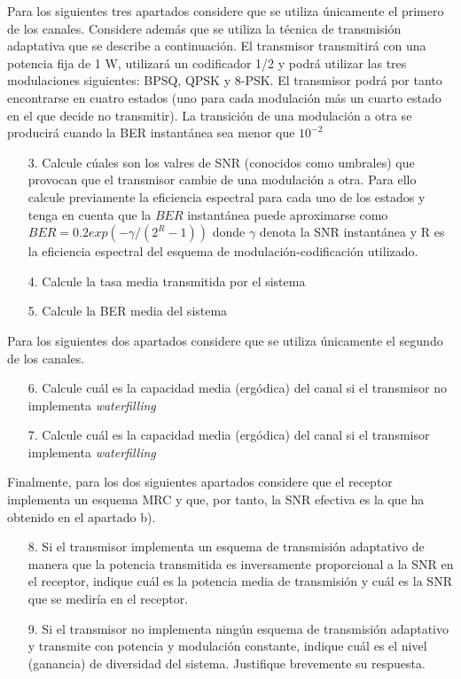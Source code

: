 \documentclass[fleqn,14pt]{article}
\begin{document}
Para los siguientes tres apartados considere que se utiliza únicamente el primero de los canales. Considere además que se utiliza la técnica de transmisión adaptativa que se describe a continuación. El transmisor transmitirá con una potencia fija de 1 W, utilizará un codificador 1/2 y podrá utilizar las tres modulaciones siguientes: BPSQ, QPSK y 8-PSK. El transmisor podrá por tanto encontrarse en cuatro estados (uno para cada modulación más un cuarto estado en el que decide no transmitir). La transición de una modulación a otra se producirá cuando la BER instantánea sea menor que $10^{-2}$

  \begin{enumerate}[1.]
    \item[3.] Calcule cúales son los valres de SNR (conocidos como umbrales) que provocan que el transmisor cambie de una modulación a otra. Para ello calcule previamente la eficiencia espectral para cada uno de los estados y tenga en cuenta que la $BER$ instantánea puede aproximarse como $BER = 0.2exp(-\gamma / (2^R-1))$ donde $\gamma$ denota la SNR instantánea y R es la eficiencia espectral del esquema de modulación-codificación utilizado.
    \item[4.] Calcule la tasa media transmitida por el sistema
    \item[5.] Calcule la BER media del sistema
  \end{enumerate}

Para los siguientes dos apartados considere que se utiliza únicamente el segundo de los canales.

  \begin{enumerate}[1.]
    \item[6.] Calcule cuál es la capacidad media (ergódica) del canal si el transmisor no implementa \textit{waterfilling}
    \item[7.] Calcule cuál es la capacidad media (ergódica) del canal si el transmisor implementa \textit{waterfilling}
  \end{enumerate}

Finalmente, para los dos siguientes apartados considere que el receptor implementa un esquema MRC y que, por tanto, la SNR efectiva es la que ha obtenido en el apartado b).

  \begin{enumerate}[1.]
    \item[8.] Si el transmisor implementa un esquema de transmisión adaptativo de manera que la potencia transmitida es inversamente proporcional a la SNR en el receptor, indique cuál es la potencia media de transmisión y cuál es la SNR que se mediría en el receptor.
    \item[9.] Si el transmisor no implementa ningún esquema de transmisión adaptativo y transmite con potencia y modulación constante, indique cuál es el nivel (ganancia) de diversidad del sistema. Justifique brevemente su respuesta.
  \end{enumerate}
\end{document}
